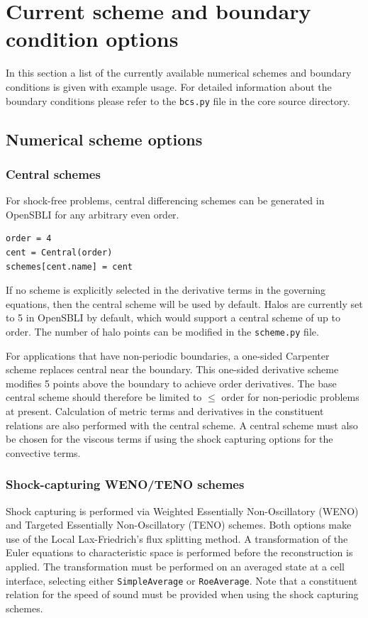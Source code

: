 \documentclass[11pt]{article}
\begin{document}
\newpage
\section{Current scheme and boundary condition options}
In this section a list of the currently available numerical schemes and boundary conditions is given with example usage. For detailed information about the boundary conditions please refer to the \verb|bcs.py| file in the core source directory.

\subsection{Numerical scheme options}
\subsubsection{Central schemes}
For shock-free problems, central differencing schemes can be generated in OpenSBLI for any arbitrary even order.
\begin{lstlisting}
order = 4
cent = Central(order)
schemes[cent.name] = cent
\end{lstlisting}
If no scheme is explicitly selected in the derivative terms in the governing equations, then the central scheme will be used by default. Halos are currently set to 5 in OpenSBLI by default, which would support a central scheme of up to  order. The number of halo points can be modified in the \verb|scheme.py| file. 

For applications that have non-periodic boundaries, a one-sided Carpenter scheme replaces central near the boundary. This one-sided derivative scheme modifies 5 points above the boundary to achieve  order derivatives. The base central scheme should therefore be limited to $\leq$  order for non-periodic problems at present. Calculation of metric terms and derivatives in the constituent relations are also performed with the central scheme. A central scheme must also be chosen for the viscous terms if using the shock capturing options for the convective terms.

\subsubsection{Shock-capturing WENO/TENO schemes}
Shock capturing is performed via Weighted Essentially Non-Oscillatory (WENO) and Targeted Essentially Non-Oscillatory (TENO) schemes. Both options make use of the Local Lax-Friedrich's flux splitting method. A transformation of the Euler equations to characteristic space is performed before the reconstruction is applied. The transformation must be performed on an averaged state at a cell interface, selecting either \verb|SimpleAverage| or \verb|RoeAverage|. Note that a constituent relation for the speed of sound must be provided when using the shock capturing schemes.
\end{document}
